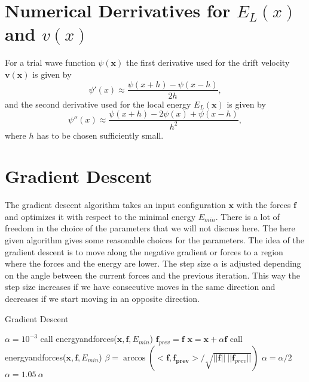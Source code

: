 \documentclass [12pt]{report}
\begin{document}
\begin{appendices}
\chapter{Numerical Derrivatives for $E_L(x)$ and $v(x)$} \label{appendixC}
For a trial wave function $\psi(\bm{x})$ the first derivative used for the drift velocity $\bm{v}(\bm{x})$ is given by
\begin{equation}
\psi'(x) \approx \frac{\psi(x + h) - \psi(x - h)}{2h},
\end{equation}
and the second derivative used for the local energy $E_L(\bm{x})$ is given by
\begin{equation}
\psi''(x) \approx \frac{\psi(x + h) - 2 \psi(x) + \psi(x - h)}{h^2},
\end{equation}
where $h$ has to be chosen sufficiently small.

\chapter{Gradient Descent} \label{gradient_descent}
The gradient descent algorithm takes an input configuration $\bm{x}$ with the forces $\bm{f}$ and optimizes it with respect to the minimal energy $E_{min}$. There is a lot of freedom in the choice of the parameters that we will not discuss here. The here given algorithm gives some reasonable choices for the parameters. The idea of the gradient descent is to move along the negative gradient or forces to a region where the forces and the energy are lower. The step size $\alpha$ is adjusted depending on the angle between the current forces and the previous iteration. This way the step size increases if we have consecutive moves in the same direction and decreases if we start moving in an opposite direction. 
\begin{algorithm}
\caption{Gradient Descent}\label{grad_desc}
\begin{algorithmic}[1]
 
\State $\alpha = 10^{-3}$
\State call energyandforces($\bm{x}, \bm{f}, E_{min}$)
 
	\State $\bm{f}_{prev} = \bm{f}$	
	\State $\bm{x} = \bm{x} + \alpha \bm{f}$
	\State call energyandforces($\bm{x}, \bm{f}, E_{min}$)
	\State $\beta = \arccos{(<\bm{f},\bm{f_{prev}}>/\sqrt{||\bm{f}||\:||\bm{f}_{prev}||})}$ 
	 
		\State $\alpha = \alpha/2$
	\Else
		\State $\alpha = 1.05\ \alpha$
	\EndIf
\EndWhile
\EndProcedure
\end{algorithmic}
\end{algorithm}
\end{appendices}



\end{document}

